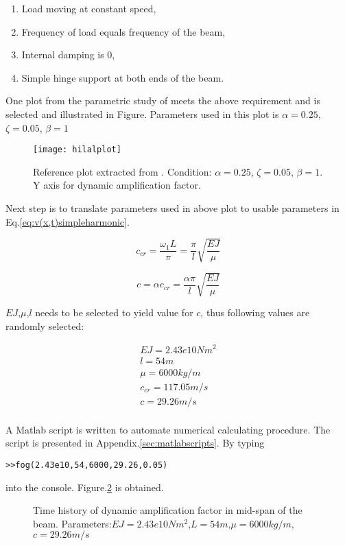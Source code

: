 \begin{enumerate}
    \item Load moving at constant speed,
    \item Frequency of load equals frequency of the beam,
    \item Internal damping is 0,
    \item Simple hinge support at both ends of the beam.
\end{enumerate}

One plot from the parametric study of \citet{abu2000vibration} meets the above requirement and is selected and illustrated in Figure. Parameters used in this plot is $\alpha = 0.25$, $\zeta = 0.05$, $\beta  = 1$

\begin{figure}[h!]
    \centering
    \texttt{[image: hilalplot]}
    \caption{Reference plot extracted from \citet{abu2000vibration}. Condition: $\alpha = 0.25$, $\zeta = 0.05$, $\beta  = 1$. Y axis for dynamic amplification factor.}
    \label{fig:hilalplot}
\end{figure}

Next step is to translate parameters used in above plot to usable parameters in Eq.\ref{eq:v(x,t)simpleharmonic}.


$$c_{cr} = \frac{\omega_1 L}{\pi} = \frac{\pi}{l}\sqrt{\frac{EJ}{\mu}}$$

$$c = \alpha c_{cr} = \frac{\alpha\pi}{l}\sqrt{\frac{EJ}{\mu}}$$

$EJ$,$\mu$,$l$ needs to be selected to yield value for $c$, thus following values are randomly selected:

$$
\begin{array}{c}
	EJ = 2.43e10 Nm^2 \\
	l = 54m \\
	\mu = 6000 kg/m \\ 
	c_{cr} = 117.05 m/s \\
	c = 29.26 m/s  \\
\end{array}
$$

A Matlab script is written to automate numerical calculating procedure. The script is presented in Appendix.\ref{sec:matlabscripts}. By typing 

\texttt{>>fog(2.43e10,54,6000,29.26,0.05)}

into the console. Figure.\ref{fig:EJ24300000000L54mu6000c29daf.tikz} is obtained.

\begin{figure}[h!]
\centering 
\newlength\figureheight 
\newlength\figurewidth 
\setlength\figureheight{4cm} 
\setlength\figurewidth{4cm} 
 
\caption{Time history of dynamic amplification factor in mid-span of the beam. Parameters:$EJ=2.43e10Nm^2$,$L=54m$,$\mu=6000kg/m$,$c=29.26m/s$} 
\label{fig:EJ24300000000L54mu6000c29daf.tikz} 
\end{figure}

